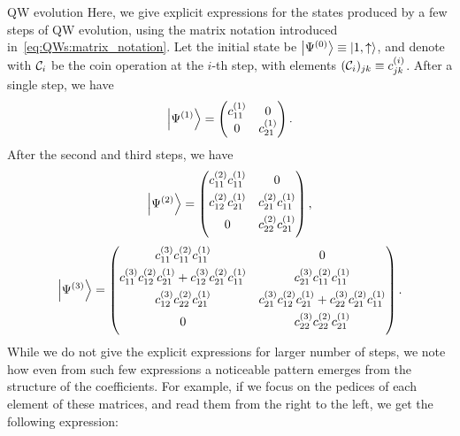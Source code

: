 \begin{examplebox}[label={ex:QWs:bimatrix_notation}]{QW evolution}
    Here, we give explicit expressions for the states produced by a few steps of \ac{QW} evolution, using the matrix notation introduced in~\cref{eq:QWs:matrix_notation}. Let the initial state be $\ket{\Psi^{(0)}}\equiv\ket{1,\uparrow}$, and denote with ${\mathcal{C}}_i$ be the coin operation at the $i$-th step, with elements $({\mathcal{C}}_i)_{jk}\equiv c^{(i)}_{jk}$.
    After a single step, we have
    \begin{equation}
        \ket{\Psi^{(1)}} =
        \begin{pmatrix}
            c^{(1)}_{11} & 0 \\
            0 & c^{(1)}_{21}
        \end{pmatrix}.
    \end{equation}
    After the second and third steps, we have
    \begin{equation}
        \ket{\Psi^{(2)}} =
        \begin{pmatrix}
            c^{(2)}_{11} c^{(1)}_{11} & 0 \\[0.4em]
            c^{(2)}_{12} c^{(1)}_{21} & c^{(2)}_{21} c^{(1)}_{11} \\[0.4em]
            0 & c^{(2)}_{22} c^{(1)}_{21} \\[0.4em]
        \end{pmatrix},
    \end{equation}
    \begin{equation}
        \ket{\Psi^{(3)}} =
        \begin{pmatrix}
            c^{(3)}_{11} c^{(2)}_{11} c^{(1)}_{11} & 0 \\[0.4em]
            c^{(3)}_{11} c^{(2)}_{12} c^{(1)}_{21} +
            c^{(3)}_{12} c^{(2)}_{21} c^{(1)}_{11} &
            c^{(3)}_{21} c^{(2)}_{11} c^{(1)}_{11} \\[0.4em]
            c^{(3)}_{12} c^{(2)}_{22} c^{(1)}_{21} &
            c^{(3)}_{21} c^{(2)}_{12} c^{(1)}_{21} +
            c^{(3)}_{22} c^{(2)}_{21} c^{(1)}_{11} \\[0.4em]
            0 & c^{(3)}_{22} c^{(2)}_{22} c^{(1)}_{21} \\[0.4em]
        \end{pmatrix}.
    \end{equation}
    While we do not give the explicit expressions for larger number of steps, we note how even from such few expressions a noticeable pattern emerges from the structure of the coefficients. For example, if we focus on the pedices of each element of these matrices, and read them from the right to the left, we get the following expression:

\end{examplebox}
